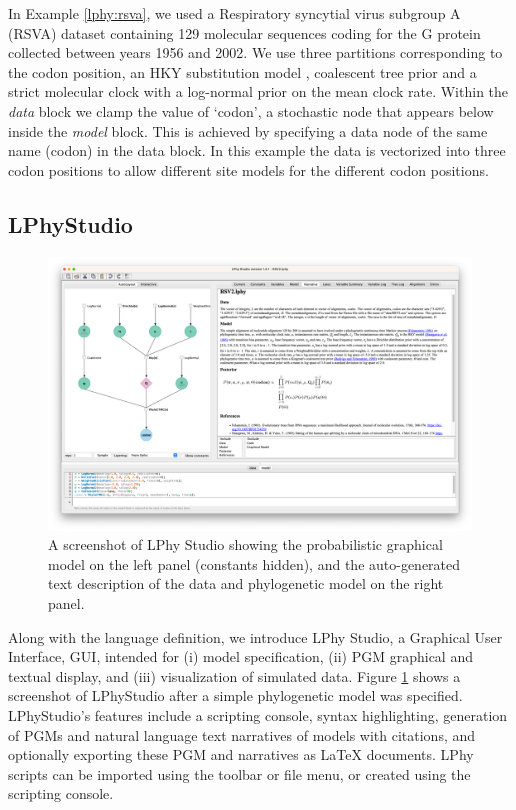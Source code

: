 \documentclass[10pt,letterpaper,table]{article}
\theoremstyle{definition}
\begin{document}
In Example \ref{lphy:rsva}, we used a Respiratory syncytial virus subgroup A (RSVA) dataset \cite{zlateva2004molecular, zlateva2005genetic} containing 129 molecular sequences coding for the G protein collected between years 1956 and 2002. 
We use three partitions corresponding to the codon position, an HKY substitution model \cite{hasegawa1985dating}, coalescent tree prior \cite{kingman82} and a strict molecular clock with a log-normal prior on the mean clock rate. 
Within the \textit{data} block we clamp the value of `codon', a stochastic node that appears below inside the \textit{model} block. 
This is achieved by specifying a data node of the same name (codon) in the data block. 
In this example the data is vectorized into three codon positions to allow different site models for the different codon positions.

\subsection{LPhyStudio} 
\begin{figure}[!h]
  \includegraphics[width=\textwidth]{figs_plos/RSV2.png}
  \caption{A screenshot of LPhy Studio showing the probabilistic graphical model 
  on the left panel (constants hidden), and the auto-generated text description of the data and phylogenetic model on the right panel.} 
  \label{fig:lphystudio}
\end{figure}
Along with the language definition, we introduce LPhy Studio, a Graphical User Interface, GUI, intended for (i) model specification, (ii) PGM graphical and textual display, and (iii) visualization of simulated data.
Figure \ref{fig:lphystudio} shows a screenshot of LPhyStudio after a simple phylogenetic model was specified. 
LPhyStudio's features include a scripting console, syntax highlighting, generation of PGMs and natural language text narratives of models with citations, and optionally exporting these PGM and narratives as LaTeX documents. 
LPhy scripts can be imported using the toolbar or file menu, or created using the scripting console. 
\end{document}
